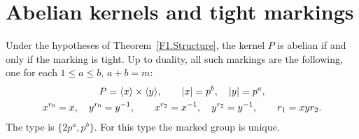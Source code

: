 \section{Abelian kernels and tight markings}
\begin{theorem}\label{F1.Abelian}
Under the hypotheses of Theorem~\ref{F1.Structure}, the kernel $P$
is abelian if and only if the marking is tight. Up to duality, all
such markings are the following, one for each $1\leq a\leq b$,
$a+b=m$:
\begin{gather*}
 P=\langle x\rangle\times\langle y\rangle,\qquad |x|=p^b,\quad |y|=p^a,\\
 x^{r_0}=x,\quad y^{r_0}=y^{-1},\qquad
 x^{r_2}=x^{-1},\quad y^{r_2}=y^{-1},\qquad r_1=xy r_2.
\end{gather*}
The type is $\{2p^a,p^b\}$. For this type the marked group is unique.
\end{theorem}
